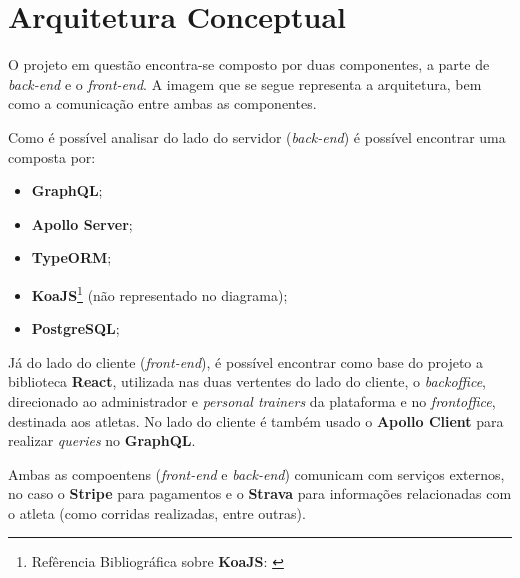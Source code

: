 \section{Arquitetura Conceptual}

O projeto em questão encontra-se composto por duas componentes, a parte de \textit{back-end} e o \textit{front-end}. A imagem que se segue representa a arquitetura, bem como a comunicação entre ambas as componentes.


Como é possível analisar do lado do servidor (\textit{back-end}) é possível encontrar uma \textbf{} composta por:

\begin{itemize}
	\item \textbf{GraphQL};
	\item \textbf{Apollo Server};
	\item \textbf{TypeORM};
	\item \textbf{KoaJS}\footnote{Refêrencia Bibliográfica sobre \textbf{KoaJS}: \cite{expressVsKoa,introkoa}} {\small(não representado no diagrama)};
	\item \textbf{PostgreSQL};
\end{itemize}

Já do lado do cliente (\textit{front-end}), é possível encontrar como base do projeto a biblioteca \textbf{React}, utilizada nas duas vertentes do lado do cliente, o \textit{backoffice}, direcionado ao administrador e \textit{personal trainers} da plataforma e no \textit{frontoffice}, destinada aos atletas. No lado do cliente é também usado o \textbf{Apollo Client} para realizar \textit{queries} no \textbf{GraphQL}.

Ambas as compoentens (\textit{front-end} e \textit{back-end}) comunicam com serviços externos, no caso o \textbf{Stripe} para pagamentos e o \textbf{Strava} para informações relacionadas com o atleta (como corridas realizadas, entre outras).
